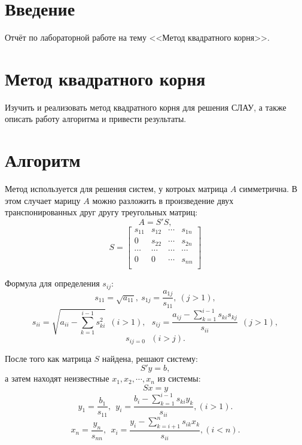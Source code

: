 \documentclass[14pt, titlepage,fleqn]{extarticle}
\begin{document}
	

	
	
	\newpage
	
	\tableofcontents   
	\clearpage
	\section*{Введение}
	Отчёт по лабораторной работе на тему <<Метод квадратного корня>>.	
	\newpage









	\section*{Метод квадратного корня}
	Изучить и реализовать  метод квадратного корня для решения СЛАУ, а также описать работу алгоритма и
	привести результаты.

	\section*{Алгоритм}
	Метод используется для решения систем, у котроых матрица $A$ симметрична. В этом случает марицу $A$ можно разложить в произведение двух транспонированных друг другу треугольных матриц:
	\[A = S'S,\]
	\[S = \begin{bmatrix}
		s_{11} & s_{12} & \cdots & s_{1n} \\
		0 & s_{22} & \cdots & s_{2n} \\
		\cdots & \cdots & \cdots & \cdots \\
		0 & 0 & \cdots & s_{nn} \\
	\end{bmatrix}\]

	Формула для определения $s_{ij}:$
	\[s_{11} = \sqrt{a_{11}}, ~ s_{1j} = \dfrac{a_{1j}}{s_{11}},~ (j>1),\]
	\[s_{ii} = \sqrt{a_{ii} - \sum_{k = 1}^{i - 1}s^2_{ki}}~~(i>1),~~~ s_{ij} = \dfrac{a_{ij} - \sum_{k = 1}^{i - 1}s_{ki}s_{kj}}{s_{ii}} ~~ (j>1),\]
	\[s_{ij = 0} ~~~ (i>j).\]

	После того как матрица $S$ найдена, решают систему:
	\[S'y =b ,\]
	\newpage
	а затем находят неизвестные $x_1,x_2,\cdots,x_n$ из системы:
	\[Sx = y\]
	\[y_1 = \dfrac{b_1}{s_{11}}, ~~ y_i = \dfrac{b_i - \sum_{k = 1}^{i - 1}s_{ki}y_k}{s_{ii}}, (i > 1).\]
	\[x_n = \dfrac{y_n}{s_{nn}},~~ x_i = \dfrac{y_i - \sum_{k = i+1}^{n}s_{ik}x_k}{s_{ii}}, (i<n).\]
	
\end{document}
